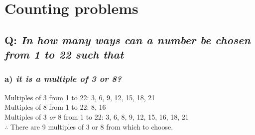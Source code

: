 \documentclass{article}
\begin{document}
\section{\sc Counting problems}

\subsection*{Q: {\em In how many ways can a number be chosen from 1 to 22 such that}}
\subsubsection*{a) {\em it is a multiple of 3 or 8?}}
Multiples of 3 from 1 to 22: {\color{red}3, 6, 9, 12, 15, 18, 21}\\[1ex]
Multiples of 8 from 1 to 22: {\color{blue}8, 16}\\[1em]
Multiples of 3 \textit{or} 8 from 1 to 22: {\color{red}3, 6,} {\color{blue}8,} {\color{red}9, 12, 15,} {\color{blue}16,} {\color{red}18, 21}\\[1ex]
$\therefore$ There are 9 multiples of 3 or 8 from which to choose.
\end{document}
